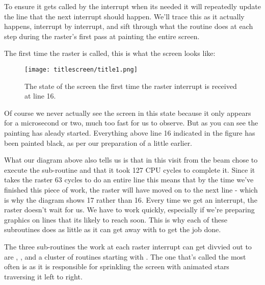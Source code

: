 To ensure it gets called by the interrupt when its needed it will repeatedly update the line that the next interrupt
should happen. We'll trace this as it actually happens, interrupt by interrupt, and sift through what the routine
does at each step during the raster's first pass at painting the entire screen.

The first time the raster is called, this is what the screen looks like:

\begin{figure}[H]
    \centering
      \texttt{[image: titlescreen/title1.png]}%
\caption{The state of the screen the first time the raster interrupt is received at line 16.}
\end{figure}

Of course we never actually see the screen in this state because it only appears for a microsecond or two, much too
fast for us to observe. But as you can see the painting has aleady started. Everything above line 16 indicated in 
the figure has been painted black, as per our preparation of  a little earlier.

What our diagram above also tells us is that in this visit from the beam  chose to execute
the sub-routine  and that it took 127 CPU cycles to complete it. Since it takes the
raster 63 cycles to do an entire line this means that by the time we've finished this piece of work, the raster will have
moved on to the next line - which is why the diagram shows 17 rather than 16. Every time we get an interrupt, the 
raster doesn't wait for us. We have to work quickly, especially if we're preparing graphics on lines that its likely
to reach soon. This is why each of these subroutines does as little as it can get away with to get the job done.

The three sub-routines the work at each raster interrupt can get divvied out to are ,
, and a cluster of routines starting with . The one
that's called the most often is  as it is responsible for sprinkling the screen with 
animated stars traversing it left to right.

